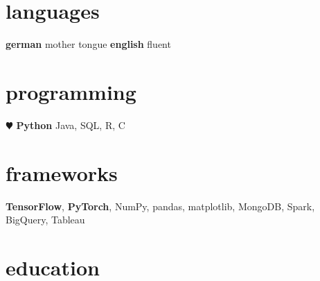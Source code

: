 \documentclass[hidelinks]{cv-style}          %
\begin{document}
\begin{aside}
\section{languages}
\textbf{german} mother tongue
\textbf{english} fluent
\section{programming}
{\color{red} $\varheartsuit$} \textbf{Python}
Java, SQL, R, C
\section{frameworks}
\textbf{TensorFlow}, \textbf{PyTorch}, NumPy, pandas, matplotlib, MongoDB, Spark, BigQuery, Tableau
\end{aside}


\section{education}
\end{document}
